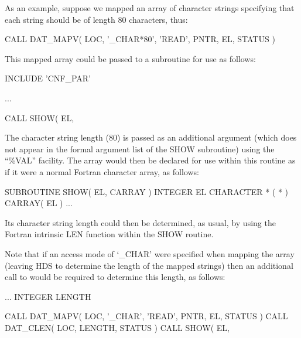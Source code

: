 \documentclass[twoside,11pt]{starlink}
\providecommand{\qt}[1]{``#1''}
\begin{document}
As an example, suppose we mapped an array of character strings
specifying that each string should be of length 80 characters, thus:

\begin{small}
\begin{terminalv}
CALL DAT_MAPV( LOC, '_CHAR*80', 'READ', PNTR, EL, STATUS )
\end{terminalv}
\end{small}
\normalsize

This mapped array could be passed to a subroutine for use as follows:

\begin{small}
\begin{terminalv}
INCLUDE 'CNF_PAR'

...

CALL SHOW( EL, %
\end{terminalv}
\end{small}

The character string length (80) is passed as an additional argument
(which does not appear in the formal argument list of the SHOW
subroutine) using the \qt{\%VAL} facility. The array would then be
declared for use within this routine as if it were a normal Fortran
character array, as follows:

\begin{small}
\begin{terminalv}
SUBROUTINE SHOW( EL, CARRAY )
INTEGER EL
CHARACTER * ( * ) CARRAY( EL )
...
\end{terminalv}
\end{small}

Its character string length could then be determined, as usual, by
using the Fortran intrinsic LEN function within the SHOW routine.

Note that if an access mode of `\_CHAR' were specified when mapping
the array (leaving HDS to determine the length of the mapped strings)
then an additional call to  would be
required to determine this length, as follows:

\begin{small}
\begin{terminalv}
...
INTEGER LENGTH

CALL DAT_MAPV( LOC, '_CHAR', 'READ', PNTR, EL, STATUS )
CALL DAT_CLEN( LOC, LENGTH, STATUS )
CALL SHOW( EL, %
\end{terminalv}
\end{small}
\end{document}
